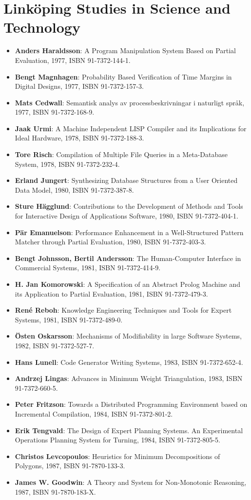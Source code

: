 \documentclass[a4paper,showtrims,twocolumn]{memoir}
\title{}
\newcommand{\adjustlayout}{
  \setlength{\trimtop}{\stockheight}
  \addtolength{\trimtop}{-\paperheight}
  \setlength{\trimedge}{\stockwidth}
  \addtolength{\trimedge}{-\paperwidth}
  \settrims{0.5\trimtop}{0.5\trimedge}
  \setlrmargins{*}{*}{1.5}
  \setulmargins{2cm}{*}{*}
}
\newcommand{\series}[1]{\section*{\footnotesize #1}}
\newenvironment{theses}
  {
    \begin{itemize}
      \setlength{\itemsep}{0.2em}
      \setlength{\parskip}{0em}
      \setlength{\parsep}{0em}
  }
  {
    \end{itemize}
  }
\newcommand{\thesis}[5]{\item[No. #1] \textbf{#2}: #3, #4, ISBN #5.}
\begin{document}
  \adjustlayout
  \checkandfixthelayout
  \pagestyle{empty}
  \maketitle
  \thispagestyle{empty}
  \fontsize{6}{7}
  \selectfont
  \raggedright

  \series{Linköping Studies in Science and Technology}

  \begin{theses}
    \thesis{14}{Anders Haraldsson}{A Program Manipulation System Based on Partial Evaluation}{1977}{91-7372-144-1}
    \thesis{17}{Bengt Magnhagen}{Probability Based Verification of Time Margins in Digital Designs}{1977}{91-7372-157-3}
    \thesis{18}{Mats Cedwall}{Semantisk analys av processbeskrivningar i naturligt språk}{1977}{91-7372-168-9}
    \thesis{22}{Jaak Urmi}{A Machine Independent LISP Compiler and its Implications for Ideal Hardware}{1978}{91-7372-188-3}
    \thesis{33}{Tore Risch}{Compilation of Multiple File Queries in a Meta-Database System}{1978}{91-7372-232-4}
    \thesis{51}{Erland Jungert}{Synthesizing Database Structures from a User Oriented Data Model}{1980}{91-7372-387-8}
    \thesis{54}{Sture Hägglund}{Contributions to the Development of Methods and Tools for Interactive Design of Applications Software}{1980}{91-7372-404-1}
    \thesis{55}{Pär Emanuelson}{Performance Enhancement in a Well-Structured Pattern Matcher through Partial Evaluation}{1980}{91-7372-403-3}
    \thesis{58}{Bengt Johnsson, Bertil Andersson}{The Human-Computer Interface in Commercial Systems}{1981}{91-7372-414-9}
    \thesis{69}{H. Jan Komorowski}{A Specification of an Abstract Prolog Machine and its Application to Partial Evaluation}{1981}{91-7372-479-3}
    \thesis{71}{René Reboh}{Knowledge Engineering Techniques and Tools for Expert Systems}{1981}{91-7372-489-0}
    \thesis{77}{Östen Oskarsson}{Mechanisms of Modifiability in large Software Systems}{1982}{91-7372-527-7}
    \thesis{94}{Hans Lunell}{Code Generator Writing Systems}{1983}{91-7372-652-4}
    \thesis{97}{Andrzej Lingas}{Advances in Minimum Weight Triangulation}{1983}{91-7372-660-5}
    \thesis{109}{Peter Fritzson}{Towards a Distributed Programming Environment based on Incremental Compilation}{1984}{91-7372-801-2}
    \thesis{111}{Erik Tengvald}{The Design of Expert Planning Systems. An Experimental Operations Planning System for Turning}{1984}{91-7372-805-5}
    \thesis{155}{Christos Levcopoulos}{Heuristics for Minimum Decompositions of Polygons}{1987}{91-7870-133-3}
    \thesis{165}{James W. Goodwin}{A Theory and System for Non-Monotonic Reasoning}{1987}{91-7870-183-X}

\end{theses}
\end{document}
